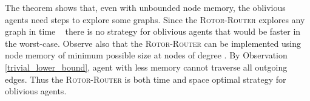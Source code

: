 \documentclass{article}[11pt,letter]
\newcommand{\RR}{{\textsc{Rotor-Router}}\xspace}
\begin{document}
The theorem shows that, even with unbounded node memory, the oblivious agents need  steps to explore some graphs. Since the \RR explores any graph in time ~\cite{Yanovski} there is no strategy for oblivious agents that would be faster in the worst-case. Observe also that the \RR can be implemented using node memory of minimum possible size  at nodes of degree . By Observation \ref{trivial_lower_bound}, agent with less memory cannot traverse all outgoing edges. Thus the \RR is both time and space optimal strategy for oblivious agents.



\end{document}
